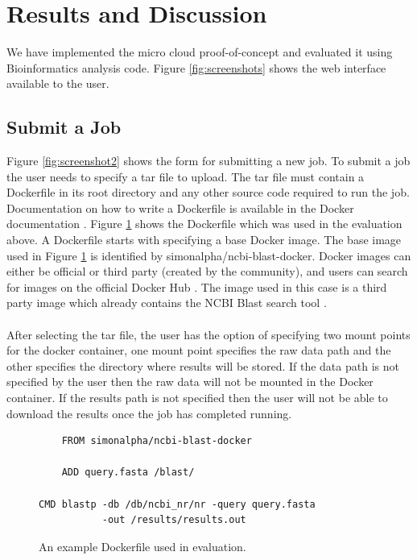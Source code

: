 \documentclass{sig-alternate-05-2015}
\begin{document}
\section{Results and Discussion}
We have implemented the micro cloud proof-of-concept and evaluated it using Bioinformatics analysis code. Figure \ref{fig:screenshots} shows the web interface available to the user. 

\subsection{Submit a Job}
Figure \ref{fig:screenshot2} shows the form for submitting a new job. 
To submit a job the user needs to specify a tar file to upload. The tar file must contain a Dockerfile in its root directory and any other source code required to run the job. Documentation on how to write a Dockerfile is available in the Docker documentation \cite{dockerfile}. Figure \ref{fig:dockerfile} shows the Dockerfile which was used in the evaluation above. A Dockerfile starts with specifying a base Docker image. The base image used in Figure \ref{fig:dockerfile} is identified by simonalpha/ncbi-blast-docker. Docker images can either be official or third party (created by the community), and users can search for images on the official Docker Hub \cite{dockerhub}. The image used in this case is a third party image which already contains the NCBI Blast search tool \cite{dockerblast}.
\\\\
After selecting the tar file, the user has the option of specifying two mount points for the docker container, one mount point specifies the raw data path and the other specifies the directory where results will be stored. If the data path is not specified by the user then the raw data will not be mounted in the Docker container. If the results path is not specified then the user will not be able to download the results once the job has completed running.

\begin{figure}
	\begin{verbatim}
	FROM simonalpha/ncbi-blast-docker

	ADD query.fasta /blast/

CMD blastp -db /db/ncbi_nr/nr -query query.fasta 
           -out /results/results.out
	\end{verbatim}
	\caption{An example Dockerfile used in evaluation.}
\label{fig:dockerfile}
\end{figure}
\end{document}
